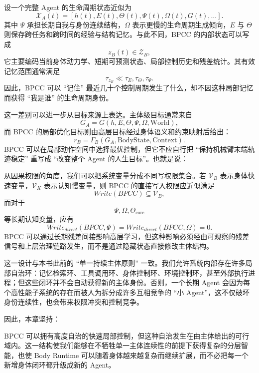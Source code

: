 设一个完整 Agent 的生命周期状态近似为
\[
\mathcal X_A(t)
=
\left[
h(t),E(t),\Theta(t),\Psi(t),\Omega(t),G(t),\ldots
\right].
\]
其中 $\Psi$ 承担长期自我与身份连续结构，$\Omega$ 表示更慢的生命周期生成倾向，$E$ 与 $\Theta$ 则保存跨任务和跨时间的经验与结构记忆。与此不同，BPCC 的内部状态可以写成
\[
z_B(t)
\in
\mathcal Z_B,
\]
它主要编码当前身体动力学、短期可预测状态、局部控制历史和残差统计。其有效记忆范围通常满足
\[
\tau_{z_B}
\ll
\tau_E,\tau_\Theta,\tau_\Psi.
\]
因此，BPCC 可以 ``记住'' 最近几十个控制周期发生了什么，却不因这种局部记忆而获得 ``我是谁'' 的生命周期身份。

这一差别可以进一步从目标来源上表达。主体级目标通常来自
\[
G_A
=
G(h,E,\Theta,\Psi,\Omega,\text{World}),
\]
而 BPCC 的局部优化目标则由高层目标经过身体语义和约束映射后给出：
\[
r_B
=
\Gamma_B(G_A,\text{BodyState},\text{Context}).
\]
BPCC 可以在局部动作空间中选择最优控制，但它不应自行把 ``保持机械臂末端轨迹稳定'' 重写成 ``改变整个 Agent 的人生目标''。也就是说：
\begin{statementbox}
\centering
{}
\end{statementbox}

从因果权限的角度，我们可以把系统变量分成不同写权限集合。若 $\mathcal V_B$ 表示身体快速变量，$\mathcal V_K$ 表示认知慢变量，则 BPCC 的直接写入权限应近似满足
\[
Write(BPCC)
\subseteq
\mathcal V_B,
\]
而对于
\[
\Psi,\Omega,\Theta_{\mathrm{core}}
\]
等长期认知变量，应有
\[
Write_{direct}(BPCC,\Psi)
=
Write_{direct}(BPCC,\Omega)
=
0.
\]
BPCC 可以通过长期残差间接影响高层学习，但这种影响必须经由可观察的残差信号和上层治理链路发生，而不是通过隐藏状态直接修改主体结构。

这一设计与本书此前的 ``单一持续主体原则'' 一致。我们允许系统内部存在许多局部自治环：记忆检索环、工具调用环、身体控制环、环境控制环，甚至外部执行进程；但这些闭环并不会自动获得新的主体身份。否则，一个长期 Agent 会因为每个高性能子系统的存在而被人为拆分成许多互相竞争的 ``小 Agent''，这不仅破坏身份连续性，也会带来权限冲突和控制竞争。

因此，本章坚持：
\begin{statementbox}
\centering
{}
\end{statementbox}
BPCC 可以拥有高度自治的快速局部控制，但这种自治发生在由主体给出的可行域内。这一结构使我们能够在不牺牲单一主体连续性的前提下获得复杂的分层智能，也使 Body Runtime 可以随着身体越来越复杂而继续扩展，而不必把每一个新增身体闭环都升级成新的 Agent。

